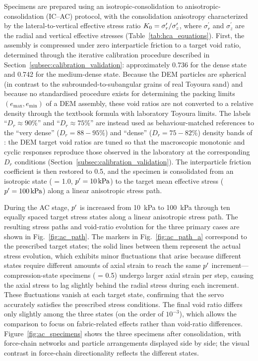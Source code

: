 Specimens are prepared using an isotropic-consolidation to anisotropic-consolidation (IC--AC) protocol, with the consolidation anisotropy characterized by the lateral-to-vertical effective stress ratio $K_0 = \sigma_r^{\prime}/\sigma_z^{\prime}$, where $\sigma_r^{\prime}$ and $\sigma_z^{\prime}$ are the radial and vertical effective stresses (Table~\ref{tab:hca_equations}). First, the assembly is compressed under zero interparticle friction to a target void ratio, determined through the iterative calibration procedure described in Section~\ref{subsec:calibration_validation}: approximately 0.736 for the dense state and 0.742 for the medium-dense state. Because the DEM particles are spherical (in contrast to the subrounded-to-subangular grains of real Toyoura sand) and because no standardised procedure exists for determining the packing limits $(e_{\max}, e_{\min})$ of a DEM assembly, these void ratios are not converted to a relative density through the textbook formula with laboratory Toyoura limits. The labels ``$D_r \approx 90\%$'' and ``$D_r \approx 75\%$'' are instead used as behaviour-matched references to the ``very dense'' ($D_r = 88\!-\!95\%$) and ``dense'' ($D_r = 75\!-\!82\%$) density bands of \citet{Ishihara1985}: the DEM target void ratios are tuned so that the macroscopic monotonic and cyclic responses reproduce those observed in the laboratory at the corresponding $D_r$ conditions (Section~\ref{subsec:calibration_validation}). The interparticle friction coefficient is then restored to 0.5, and the specimen is consolidated from an isotropic state (\Kzero{} = 1.0, $p^\prime=\SI{10}{kPa}$) to the target mean effective stress ($p^\prime=\SI{100}{kPa}$) along a linear anisotropic stress path.

During the AC stage, $p^\prime$ is increased from \SI{10}{kPa} to \SI{100}{kPa} through ten equally spaced target stress states along a linear anisotropic stress path. The resulting stress paths and void-ratio evolution for the three primary cases are shown in Fig.~\ref{fig:ac_path}. The markers in Fig.~\ref{fig:ac_path_a} correspond to the prescribed target states; the solid lines between them represent the actual stress evolution, which exhibits minor fluctuations that arise because different \Kzero{} states require different amounts of axial strain to reach the same $p^\prime$ increment---compression-state specimens (\Kzero{} = 0.5) undergo larger axial strain per step, causing the axial stress to lag slightly behind the radial stress during each increment. These fluctuations vanish at each target state, confirming that the servo accurately satisfies the prescribed stress conditions. The final void ratio differs only slightly among the three states (on the order of $10^{-3}$), which allows the comparison to focus on fabric-related effects rather than void-ratio differences. Figure~\ref{fig:ac_specimens} shows the three specimens after consolidation, with force-chain networks and particle arrangements displayed side by side; the visual contrast in force-chain directionality reflects the different \Kzero{} states.

